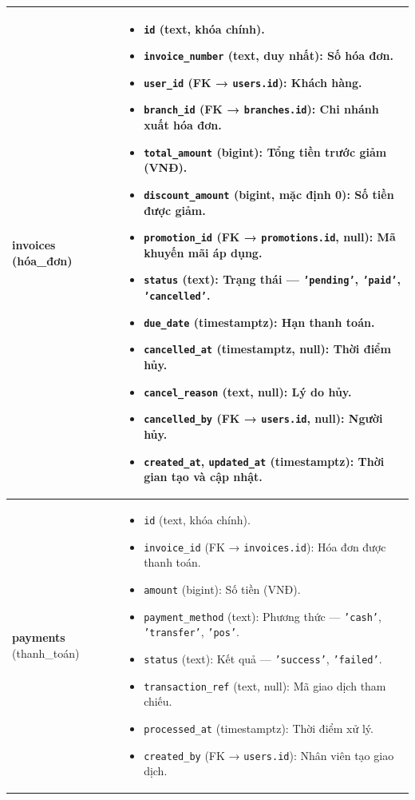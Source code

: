 \begin{longtable}{|>{\centering\arraybackslash}m{4.5cm}|>{\raggedright\arraybackslash}m{11.5cm}|}
\textbf{invoices} \newline (hóa\_đơn) &
\begin{itemize}
    \item \texttt{id} (text, khóa chính).
    \item \texttt{invoice\_number} (text, duy nhất): Số hóa đơn.
    \item \texttt{user\_id} (FK → \texttt{users.id}): Khách hàng.
    \item \texttt{branch\_id} (FK → \texttt{branches.id}): Chi nhánh xuất hóa đơn.
    \item \texttt{total\_amount} (bigint): Tổng tiền trước giảm (VNĐ).
    \item \texttt{discount\_amount} (bigint, mặc định 0): Số tiền được giảm.
    \item \texttt{promotion\_id} (FK → \texttt{promotions.id}, null): Mã khuyến mãi áp dụng.
    \item \texttt{status} (text): Trạng thái — \texttt{'pending'}, \texttt{'paid'}, \texttt{'cancelled'}.
    \item \texttt{due\_date} (timestamptz): Hạn thanh toán.
    \item \texttt{cancelled\_at} (timestamptz, null): Thời điểm hủy.
    \item \texttt{cancel\_reason} (text, null): Lý do hủy.
    \item \texttt{cancelled\_by} (FK → \texttt{users.id}, null): Người hủy.
    \item \texttt{created\_at}, \texttt{updated\_at} (timestamptz): Thời gian tạo và cập nhật.
\end{itemize} \\ \hline

\textbf{payments} \newline (thanh\_toán) &
\begin{itemize}
    \item \texttt{id} (text, khóa chính).
    \item \texttt{invoice\_id} (FK → \texttt{invoices.id}): Hóa đơn được thanh toán.
    \item \texttt{amount} (bigint): Số tiền (VNĐ).
    \item \texttt{payment\_method} (text): Phương thức — \texttt{'cash'}, \texttt{'transfer'}, \texttt{'pos'}.
    \item \texttt{status} (text): Kết quả — \texttt{'success'}, \texttt{'failed'}.
    \item \texttt{transaction\_ref} (text, null): Mã giao dịch tham chiếu.
    \item \texttt{processed\_at} (timestamptz): Thời điểm xử lý.
    \item \texttt{created\_by} (FK → \texttt{users.id}): Nhân viên tạo giao dịch.
\end{itemize} \\ \hline


\end{longtable}
